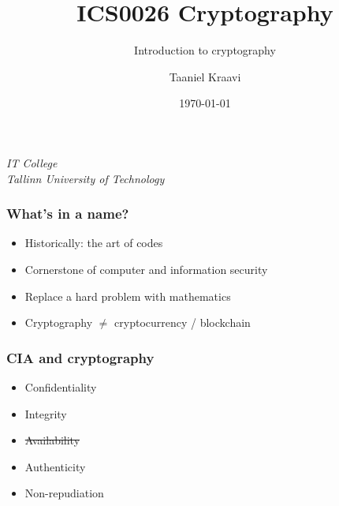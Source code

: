 \usepackage{graphicx}
\usepackage{soul}

\title{ICS0026 Cryptography}
\subtitle{Introduction to cryptography}
\date{\today}
\author{Taaniel Kraavi}
\institute%
{%
  \textit{IT College}\\
  \textit{Tallinn University of Technology}
}


\begin{frame}[plain]
  \titlepage
\end{frame}

\begin{frame}
  \frametitle{What's in a name?}

  \pause
  \begin{itemize}[<+->]
    \item Historically: the art of codes
    \item Cornerstone of computer and information security
    \item Replace a hard problem with mathematics
    \item Cryptography $\neq$ cryptocurrency / blockchain
  \end{itemize}
\end{frame}

\begin{frame}
  \frametitle{CIA and cryptography}

  \pause
  \begin{itemize}[<+(1)->]
    \item Confidentiality
    \item Integrity
    \item \st{Availability}
    \pause
    \item Authenticity
    \item Non-repudiation
  \end{itemize}
\end{frame}

